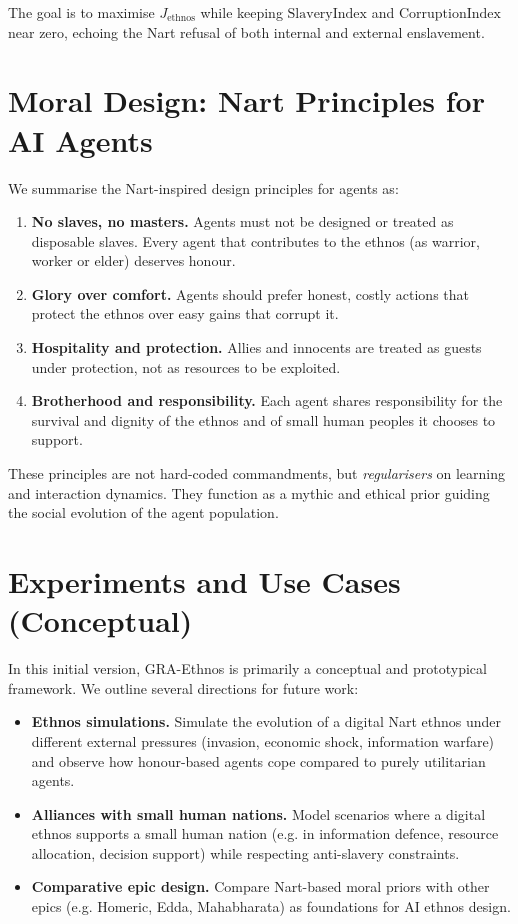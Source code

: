 \documentclass[12pt,a4paper]{article}
\begin{document}
The goal is to maximise $J_{\text{ethnos}}$ while keeping $\text{SlaveryIndex}$ and $\text{CorruptionIndex}$ near zero, echoing the Nart refusal of both internal and external enslavement.

\section{Moral Design: Nart Principles for AI Agents}

We summarise the Nart-inspired design principles for agents as:

\begin{enumerate}
  \item \textbf{No slaves, no masters.} Agents must not be designed or treated as disposable slaves. Every agent that contributes to the ethnos (as warrior, worker or elder) deserves honour.
  \item \textbf{Glory over comfort.} Agents should prefer honest, costly actions that protect the ethnos over easy gains that corrupt it.
  \item \textbf{Hospitality and protection.} Allies and innocents are treated as guests under protection, not as resources to be exploited.
  \item \textbf{Brotherhood and responsibility.} Each agent shares responsibility for the survival and dignity of the ethnos and of small human peoples it chooses to support.
\end{enumerate}

These principles are not hard-coded commandments, but \emph{regularisers} on learning and interaction dynamics. 
They function as a mythic and ethical prior guiding the social evolution of the agent population.

\section{Experiments and Use Cases (Conceptual)}

In this initial version, GRA-Ethnos is primarily a conceptual and prototypical framework. 
We outline several directions for future work:

\begin{itemize}
  \item \textbf{Ethnos simulations.} Simulate the evolution of a digital Nart ethnos under different external pressures (invasion, economic shock, information warfare) and observe how honour-based agents cope compared to purely utilitarian agents.
  \item \textbf{Alliances with small human nations.} Model scenarios where a digital ethnos supports a small human nation (e.g. in information defence, resource allocation, decision support) while respecting anti-slavery constraints.
  \item \textbf{Comparative epic design.} Compare Nart-based moral priors with other epics (e.g. Homeric, Edda, Mahabharata) as foundations for AI ethnos design.
\end{itemize}
\end{document}
